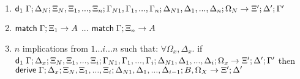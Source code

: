 \begin{theorem}
   \begin{enumerate}
      \item $\mathsf{d}_1 \; \Gamma; \Delta_N; \Xi_N, \Xi_1, ..., \Xi_n; \Gamma_{N1}, \Gamma_1, ..., \Gamma_n; \Delta_{N1}, \Delta_1, ..., \Delta_n; \Omega_N \rightarrow \Xi'; \Delta'; \Gamma'$
      \item $\mathsf{match} \; \Gamma; \Xi_1 \rightarrow A$ ... $\mathsf{match} \; \Gamma; \Xi_n \rightarrow A$
      \item $n$ implications from $1...i...n$ such that: $\forall \Omega_x, \Delta_x.$ if $\mathsf{d}_1 \; \Gamma; \Delta_x; \Xi_N, \Xi_1, ..., \Xi_i; \Gamma_{N1}, \Gamma_1, ..., \Gamma_i; \Delta_{N1}, \Delta_1, ..., \Delta_i; \Omega_x \rightarrow \Xi'; \Delta'; \Gamma'$ then $\mathsf{derive} \; \Gamma; \Delta_x; \Xi_N, \Xi_1, ..., \Xi_i; \Delta_{N1}, \Delta_1, ..., \Delta_{i-1}; B, \Omega_X \rightarrow \Xi'; \Delta'$
   \end{enumerate}
\end{theorem}

